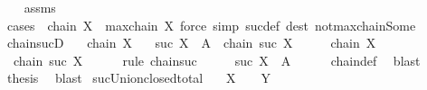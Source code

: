 \begin{isabellebody}
%
\isadelimproof
\ \ %
\endisadelimproof
%
\isatagproof
{}\isamarkupfalse%
\ assms\isanewline
\ \ \isamarkupfalse%
\ {\isacharparenleft}{\kern0pt}cases\ {\isachardoublequoteopen}{\isasymnot}\ chain\ X\ {\isasymor}\ maxchain\ X{\isachardoublequoteclose}{\isacharparenright}{\kern0pt}\ {\isacharparenleft}{\kern0pt}force\ simp{\isacharcolon}{\kern0pt}\ suc{\isacharunderscore}{\kern0pt}def\ dest{\isacharcolon}{\kern0pt}\ not{\isacharunderscore}{\kern0pt}maxchain{\isacharunderscore}{\kern0pt}Some{\isacharparenright}{\kern0pt}{\isacharplus}{\kern0pt}%
\endisatagproof
{\isafoldproof}%
%
\isadelimproof
\isanewline
%
\endisadelimproof
\isanewline
{}\isamarkupfalse%
\ chain{\isacharunderscore}{\kern0pt}sucD{\isacharcolon}{\kern0pt}\isanewline
\ \ \ {\isachardoublequoteopen}chain\ X{\isachardoublequoteclose}\isanewline
\ \ \ {\isachardoublequoteopen}suc\ X\ {\isasymsubseteq}\ A\ {\isasymand}\ chain\ {\isacharparenleft}{\kern0pt}suc\ X{\isacharparenright}{\kern0pt}{\isachardoublequoteclose}\isanewline
%
\isadelimproof
%
\endisadelimproof
%
\isatagproof
{}\isamarkupfalse%
\ {\isacharminus}{\kern0pt}\isanewline
\ \ \isamarkupfalse%
\ {\isacartoucheopen}chain\ X{\isacartoucheclose}\ \isamarkupfalse%
\ {\isacharasterisk}{\kern0pt}{\isacharcolon}{\kern0pt}\ {\isachardoublequoteopen}chain\ {\isacharparenleft}{\kern0pt}suc\ X{\isacharparenright}{\kern0pt}{\isachardoublequoteclose}\isanewline
\ \ \ \ \isamarkupfalse%
\ {\isacharparenleft}{\kern0pt}rule\ chain{\isacharunderscore}{\kern0pt}suc{\isacharparenright}{\kern0pt}\isanewline
\ \ \isamarkupfalse%
\ \isamarkupfalse%
\ {\isachardoublequoteopen}suc\ X\ {\isasymsubseteq}\ A{\isachardoublequoteclose}\isanewline
\ \ \ \ \isamarkupfalse%
\ chain{\isacharunderscore}{\kern0pt}def\ \isamarkupfalse%
\ blast\isanewline
\ \ \isamarkupfalse%
\ {\isacharasterisk}{\kern0pt}\ \isamarkupfalse%
\ {\isacharquery}{\kern0pt}thesis\ \isamarkupfalse%
\ blast\isanewline
{}\isamarkupfalse%
%
\endisatagproof
{\isafoldproof}%
%
\isadelimproof
\isanewline
%
\endisadelimproof
\isanewline
{}\isamarkupfalse%
\ suc{\isacharunderscore}{\kern0pt}Union{\isacharunderscore}{\kern0pt}closed{\isacharunderscore}{\kern0pt}total{\isacharprime}{\kern0pt}{\isacharcolon}{\kern0pt}\isanewline
\ \ \ {\isachardoublequoteopen}X\ {\isasymin}\ {\isasymC}{\isachardoublequoteclose}\ \ {\isachardoublequoteopen}Y\ {\isasymin}\ {\isasymC}{\isachardoublequoteclose}\isanewline

\end{isabellebody}
